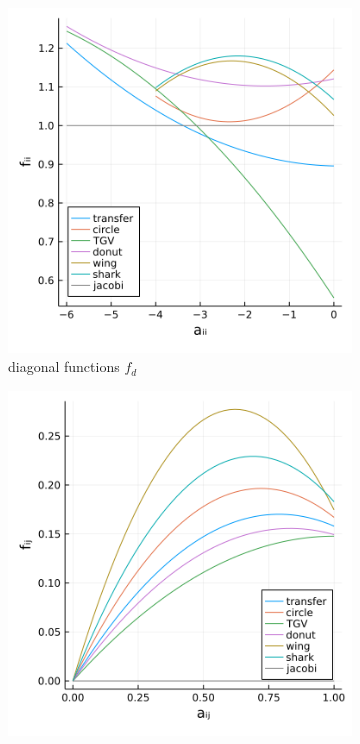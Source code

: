 \documentclass[review]{elsarticle}
\begin{document}
\begin{figure}
    \centering
    \begin{subfigure}[b]{0.47\textwidth}
        \centering
        \includegraphics[width=\textwidth]{figures/diag_fun.png}
        \caption{diagonal functions $f_d$}
    \end{subfigure}
    \hfill
    \begin{subfigure}[b]{0.47\textwidth}
        \centering
        \includegraphics[width=\textwidth]{figures/lower_fun.png}

\end{subfigure}
\end{figure}
\end{document}
